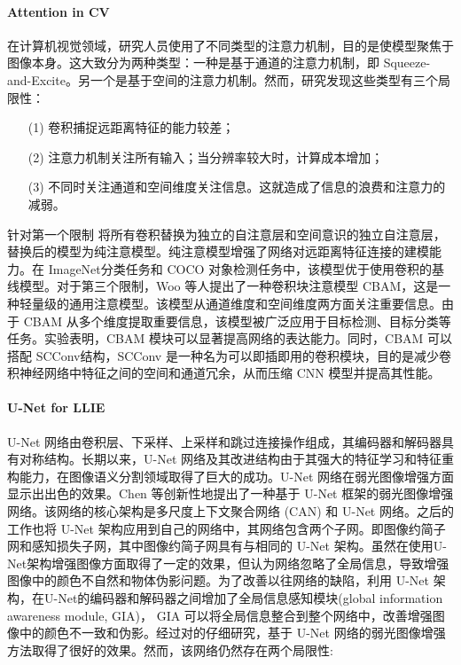 \documentclass[a4paper, 10pt]{article}
\begin{document}
		\paragraph{Attention in CV}
		
		在计算机视觉领域，研究人员使用了不同类型的注意力机制，目的是使模型聚焦于图像本身。这大致分为两种类型：一种是基于通道的注意力机制，即 Squeeze-and-Excite。另一个是基于空间的注意力机制\cite{woo2018cbam}。然而，研究发现这些类型有三个局限性：
		
		\begin{itemize}
			\item[(1)] 
			卷积捕捉远距离特征的能力较差；
			
			\item[(2)]
			注意力机制关注所有输入；当分辨率较大时，计算成本增加；
			
			\item[(3)]
			不同时关注通道和空间维度关注信息。这就造成了信息的浪费和注意力的减弱。
		\end{itemize}	
		
		针对第一个限制 \cite{ramachandran2019stand} 将所有卷积替换为独立的自注意层和空间意识的独立自注意层，替换后的模型为纯注意模型。纯注意模型增强了网络对远距离特征连接的建模能力。在 ImageNet分类任务和 COCO 对象检测任务中，该模型优于使用卷积的基线模型。对于第三个限制，Woo 等人\cite{woo2018cbam}提出了一种卷积块注意模型 CBAM，这是一种轻量级的通用注意模型。该模型从通道维度和空间维度两方面关注重要信息。由于 CBAM 从多个维度提取重要信息，该模型被广泛应用于目标检测、目标分类等任务。实验表明，CBAM 模块可以显著提高网络的表达能力。同时，CBAM 可以搭配 SCConv\cite{li2023scconv}结构，SCConv 是一种名为可以即插即用的卷积模块，目的是减少卷积神经网络中特征之间的空间和通道冗余，从而压缩 CNN 模型并提高其性能。
		
		\paragraph{U-Net for LLIE}
		
		U-Net 网络由卷积层、下采样、上采样和跳过连接操作组成，其编码器和解码器具有对称结构。长期以来，U-Net 网络及其改进结构由于其强大的特征学习和特征重构能力，在图像语义分割领域取得了巨大的成功。U-Net 网络在弱光图像增强方面显示出出色的效果。Chen 等\cite{chen2018learning}创新性地提出了一种基于 U-Net 框架的弱光图像增强网络。该网络的核心架构是多尺度上下文聚合网络 (CAN) 和 U-Net 网络。之后的工作\cite{chen2018learning, zamir2021learning}也将 U-Net 架构应用到自己的网络中，其网络包含两个子网。即图像约简子网和感知损失子网，其中图像约简子网具有与\cite{chen2018learning}相同的 U-Net 架构。虽然\cite{chen2018learning, zamir2021learning}在使用U-Net架构增强图像方面取得了一定的效果，但\cite{meng2020gia}认为\cite{chen2018learning, zamir2021learning}网络忽略了全局信息，导致增强图像中的颜色不自然和物体伪影问题。为了改善以往网络的缺陷，利用 U-Net 架构，\cite{meng2020gia}在U-Net的编码器和解码器之间增加了全局信息感知模块(global information awareness module, GIA)， GIA 可以将全局信息整合到整个网络中，改善增强图像中的颜色不一致和伪影。经过对\cite{chen2018learning, meng2020gia, zamir2021learning}的仔细研究，基于 U-Net 网络的弱光图像增强方法取得了很好的效果。然而，该网络仍然存在两个局限性:
		
\end{document}
